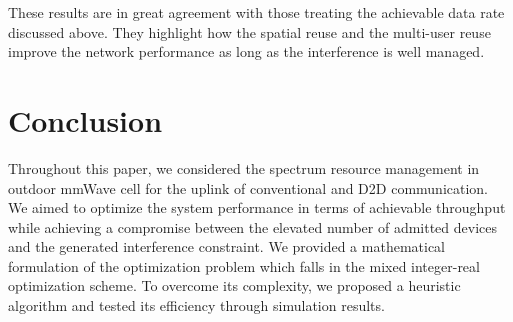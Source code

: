 \documentclass[conference,onecolumn,12pt]{IEEEtran}
\begin{document}
These results are in great agreement with those treating the achievable data rate discussed above. They highlight how the spatial reuse and the multi-user reuse improve the network performance as long as the interference is well managed.
\section{Conclusion}
Throughout this paper, we considered the spectrum resource management in outdoor mmWave cell for the uplink of conventional and D2D communication. We aimed to optimize the system performance in terms of achievable throughput while achieving a compromise between the elevated number of admitted devices and the generated interference constraint. We provided a mathematical formulation of the optimization problem which falls in the mixed integer-real optimization scheme. To overcome its complexity, we proposed a heuristic algorithm and tested its efficiency through simulation results.





\end{document}
